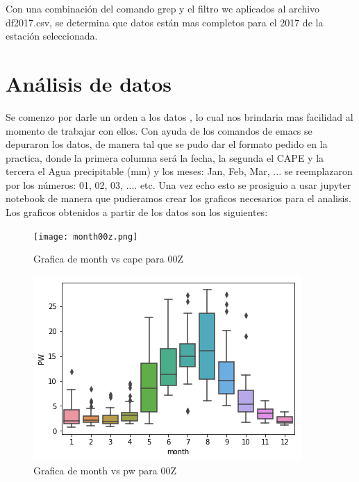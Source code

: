 \documentclass{article}
\begin{document}
Con una combinación del comando grep y el filtro wc aplicados al archivo df2017.csv, se determina que datos están mas completos para el 2017 de la estación seleccionada.


\section{Análisis de datos}
Se comenzo por darle un orden a los datos , lo cual nos brindaria mas facilidad al momento de trabajar con ellos.
\newline
Con ayuda de los comandos de emacs se depuraron los datos, de manera tal que se pudo dar el formato pedido en la practica, donde la primera columna será la fecha, la segunda el CAPE y la tercera el Agua precipitable (mm) y los meses: Jan, Feb, Mar, ... se reemplazaron por los números: 01, 02, 03, .... etc.
\newline
Una vez echo esto se prosiguio a usar jupyter notebook de manera que pudieramos crear los graficos necesarios para el analisis.
Los graficos obtenidos a partir de los datos son los siguientes:


\begin{figure}[H]
\centering
\texttt{[image: month00z.png]}
\caption{Grafica de month vs cape para 00Z}
\label{figure: mes vs cape para 00Z}
\end{figure}

\begin{figure}[H]
\centering
\includegraphics[scale=0.59]{pw00z.png}
\caption{Grafica de month vs pw para 00Z}
\label{figure: mes vs cape para 00Z}
\end{figure}
\end{document}
